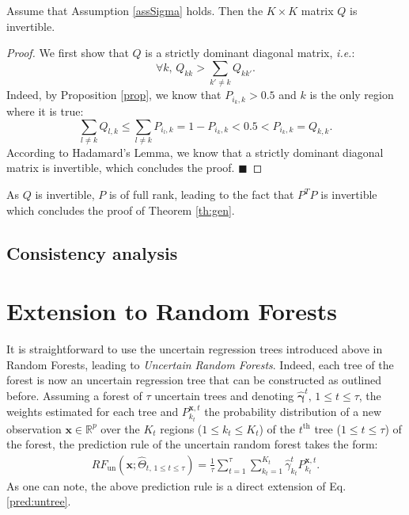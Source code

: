 \documentclass[twoside,11pt]{article}
\begin{document}
\begin{proposition}
Assume that Assumption \eqref{assSigma} holds. Then the $K\times K$ matrix $Q$ is invertible.
\end{proposition}
\begin{proof}
We first show that $Q$ is a strictly dominant diagonal matrix, \textit{i.e.}:
%
\[
\forall k,\,Q_{kk}>\sum_{k'\neq k}Q_{kk'}.
\]
%
Indeed, by  Proposition \ref{prop}, we know that $P_{i_k,k}>0.5$ and $k$ is the only region where it is true:
\[
\sum_{l\neq k}Q_{l,k}\leq \sum_{l\neq k}P_{i_l,k} = 1 - P_{i_k,k} <0.5<P_{i_k,k}=Q_{k,k}.
\]
%
According to Hadamard's Lemma, we know that a strictly dominant diagonal matrix is invertible, which concludes the proof.
\hfill $\blacksquare$
\end{proof}
%
As $Q$ is invertible, $P$ is of full rank, leading to the fact that $P^T P$ is invertible which concludes the proof of Theorem \ref{th:gen}.

\subsection{Consistency analysis}

\section{Extension to Random Forests}
\label{sec:RF}

It is straightforward to use the uncertain regression trees introduced above in Random Forests, leading to \textit{Uncertain Random Forests}. Indeed, each tree of the forest is now an uncertain regression tree that can be constructed as outlined before. Assuming a forest of $\tau$ uncertain trees and denoting $\hat{\boldsymbol{\gamma}}^t, \, 1 \le t \le \tau$, the weights estimated for each tree and $P^{\boldsymbol{x},t}_{k_t}$ the probability distribution of a new observation $\boldsymbol{x}\in \mathbb{R}^p$ over the $K_t$ regions ($1 \le k_t \le K_t$) of the $t^{\text{th}}$ tree ($1 \le t \le \tau$) of the forest, the prediction rule of the uncertain random forest takes the form:
%
\begin{align}
    RF_{\text{un}}\left(\boldsymbol{x}; \hat{\Theta}_{t, \, 1 \le t \le \tau}\right) = \frac{1}{\tau} \sum_{t=1}^{\tau} \sum_{k_t=1}^{K_t} \hat{\gamma}^t_{k_t} P^{\boldsymbol{x},t}_{k_t}.
  \label{pred:unrf}
\end{align}
%
As one can note, the above prediction rule is a direct extension of Eq. \eqref{pred:untree}.
\end{document}
